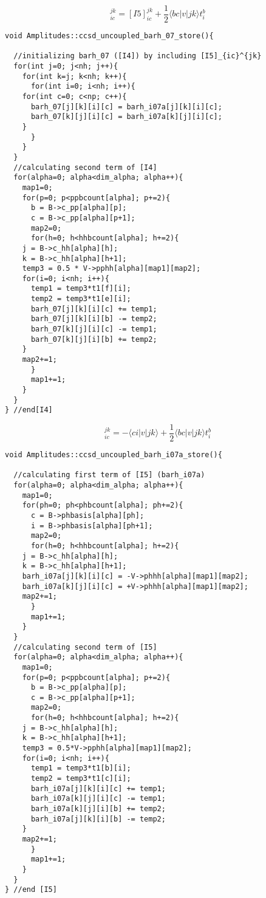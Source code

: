 \begin{equation*}
[I4]_{ic}^{jk}=[I5]_{ic}^{jk}+\frac{1}{2}\langle bc|v|jk\rangle t_i^b 
\end{equation*}
%
\begin{lstlisting}[label={list:impl:intermediate4},caption={implementation of I4 in the amp1 class function ccsd\_uncoupled\_barh\_07\_store}]
void Amplitudes::ccsd_uncoupled_barh_07_store(){

  //initializing barh_07 ([I4]) by including [I5]_{ic}^{jk}
  for(int j=0; j<nh; j++){
    for(int k=j; k<nh; k++){
      for(int i=0; i<nh; i++){
	for(int c=0; c<np; c++){
	  barh_07[j][k][i][c] = barh_i07a[j][k][i][c];
	  barh_07[k][j][i][c] = barh_i07a[k][j][i][c];
	}
      }
    }
  }
  //calculating second term of [I4]
  for(alpha=0; alpha<dim_alpha; alpha++){
    map1=0;
    for(p=0; p<ppbcount[alpha]; p+=2){
      b = B->c_pp[alpha][p];
      c = B->c_pp[alpha][p+1];
      map2=0;
      for(h=0; h<hhbcount[alpha]; h+=2){
	j = B->c_hh[alpha][h];
	k = B->c_hh[alpha][h+1];
	temp3 = 0.5 * V->pphh[alpha][map1][map2];
	for(i=0; i<nh; i++){
	  temp1 = temp3*t1[f][i];
	  temp2 = temp3*t1[e][i];
	  barh_07[j][k][i][c] += temp1;
	  barh_07[j][k][i][b] -= temp2;
	  barh_07[k][j][i][c] -= temp1;
	  barh_07[k][j][i][b] += temp2;
	}
	map2+=1;
      }
      map1+=1;
    }
  }
} //end[I4]
\end{lstlisting}
%
\begin{equation*}
[I5]_{ic}^{jk}=-\langle ci|v|jk\rangle+\frac{1}{2}\langle bc|v|jk\rangle t_i^b
\end{equation*}
\begin{lstlisting}[label={list:impl:intermediate5},caption={implementation of I5 in the amp1 class function ccsd\_uncoupled\_barh\_i07a\_store}]
void Amplitudes::ccsd_uncoupled_barh_i07a_store(){
  
  //calculating first term of [I5] (barh_i07a)
  for(alpha=0; alpha<dim_alpha; alpha++){
    map1=0;
    for(ph=0; ph<phbcount[alpha]; ph+=2){
      c = B->phbasis[alpha][ph];
      i = B->phbasis[alpha][ph+1];
      map2=0;
      for(h=0; h<hhbcount[alpha]; h+=2){
	j = B->c_hh[alpha][h];
	k = B->c_hh[alpha][h+1];
	barh_i07a[j][k][i][c] = -V->phhh[alpha][map1][map2];
	barh_i07a[k][j][i][c] = +V->phhh[alpha][map1][map2];
	map2+=1;
      }
      map1+=1;
    }
  }
  //calculating second term of [I5]
  for(alpha=0; alpha<dim_alpha; alpha++){
    map1=0;
    for(p=0; p<ppbcount[alpha]; p+=2){
      b = B->c_pp[alpha][p];
      c = B->c_pp[alpha][p+1];
      map2=0;
      for(h=0; h<hhbcount[alpha]; h+=2){
	j = B->c_hh[alpha][h];
	k = B->c_hh[alpha][h+1];
	temp3 = 0.5*V->pphh[alpha][map1][map2];
	for(i=0; i<nh; i++){
	  temp1 = temp3*t1[b][i];
	  temp2 = temp3*t1[c][i];
	  barh_i07a[j][k][i][c] += temp1;
	  barh_i07a[k][j][i][c] -= temp1;
	  barh_i07a[k][j][i][b] += temp2;
	  barh_i07a[j][k][i][b] -= temp2;
	}
	map2+=1;
      }
      map1+=1;
    }
  }
} //end [I5]
\end{lstlisting}

